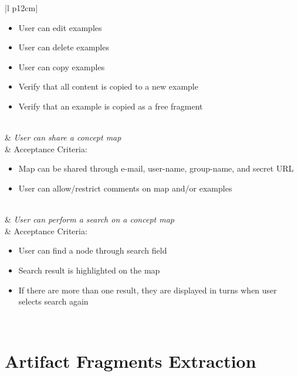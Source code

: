 \begin{center}
\begin{supertabular}{|l p{12cm}|}
	       \begin{itemize}[nosep,label=--]
	         \item User can edit examples
	         \item User can delete examples
	         \item User can copy examples
	         \item Verify that all content is copied to a new example
	         \item Verify that an example is copied as a free fragment
	       \end{itemize} \\  & \textit{User can share a concept map}  \\ 
     	 & Acceptance Criteria:  
	       \begin{itemize}[nosep,label=--]
	         \item Map can be shared through e-mail, user-name, group-name, and
	         secret URL
	         \item User can allow/restrict comments on map and/or examples
	       \end{itemize} \\  & \textit{User can perform a search on a concept map}  \\ 
     	 & Acceptance Criteria:  
	       \begin{itemize}[nosep,label=--]
	         \item User can find a node through search field
	         \item Search result is highlighted on the map
	         \item If there are more than one result, they are displayed in turns
	         when user selects search again
	       \end{itemize} \\ \hline
    \end{supertabular}
    \label{tab:req2}
\end{center}

\section{Artifact Fragments Extraction}

